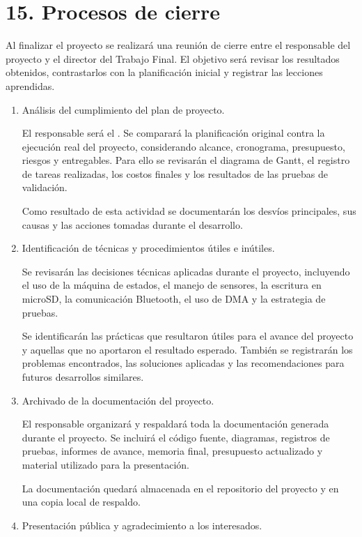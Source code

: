 \documentclass[
11pt, %
]{charter}
\begin{document}
\section{15. Procesos de cierre}    
\label{sec:cierre}

Al finalizar el proyecto se realizará una reunión de cierre entre el responsable del proyecto y el director del Trabajo Final. El objetivo será revisar los resultados obtenidos, contrastarlos con la planificación inicial y registrar las lecciones aprendidas.

\begin{enumerate}
	\item Análisis del cumplimiento del plan de proyecto.

	El responsable será el \authorname. Se comparará la planificación original contra la ejecución real del proyecto, considerando alcance, cronograma, presupuesto, riesgos y entregables. Para ello se revisarán el diagrama de Gantt, el registro de tareas realizadas, los costos finales y los resultados de las pruebas de validación.

	Como resultado de esta actividad se documentarán los desvíos principales, sus causas y las acciones tomadas durante el desarrollo.

	\item Identificación de técnicas y procedimientos útiles e inútiles.

	Se revisarán las decisiones técnicas aplicadas durante el proyecto, incluyendo el uso de la máquina de estados, el manejo de sensores, la escritura en microSD, la comunicación Bluetooth, el uso de DMA y la estrategia de pruebas.

	Se identificarán las prácticas que resultaron útiles para el avance del proyecto y aquellas que no aportaron el resultado esperado. También se registrarán los problemas encontrados, las soluciones aplicadas y las recomendaciones para futuros desarrollos similares.

	\item Archivado de la documentación del proyecto.

	El responsable organizará y respaldará toda la documentación generada durante el proyecto. Se incluirá el código fuente, diagramas, registros de pruebas, informes de avance, memoria final, presupuesto actualizado y material utilizado para la presentación.

	La documentación quedará almacenada en el repositorio del proyecto y en una copia local de respaldo.

	\item Presentación pública y agradecimiento a los interesados.


\end{enumerate}
\end{document}
